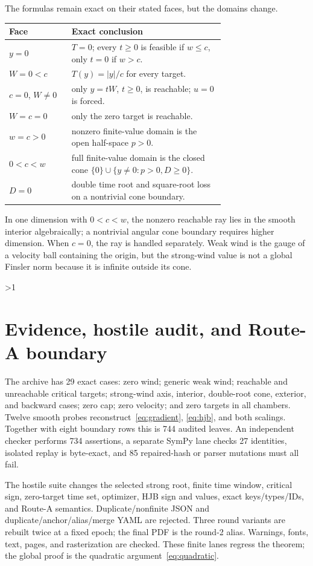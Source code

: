 \documentclass[10pt]{article}
\providecommand{\CRevisionRound}{2}
\begin{document}
The formulas remain exact on their stated faces, but the domains change.
\begin{center}\small
\begin{tabular}{@{}lp{0.71\linewidth}@{}}
\toprule
Face & Exact conclusion \\
\midrule
$y=0$ & $T=0$; every $t\ge0$ is feasible if $w\le c$, only $t=0$ if $w>c$. \\
$W=0<c$ & $T(y)=|y|/c$ for every target. \\
$c=0$, $W\ne0$ & only $y=tW$, $t\ge0$, is reachable; $u=0$ is forced. \\
$W=c=0$ & only the zero target is reachable. \\
$w=c>0$ & nonzero finite-value domain is the open half-space $p>0$. \\
$0<c<w$ & full finite-value domain is the closed cone $\{0\}\cup\{y\ne0:p>0,D\ge0\}$. \\
$D=0$ & double time root and square-root loss on a nontrivial cone boundary. \\
\bottomrule
\end{tabular}
\end{center}
In one dimension with $0<c<w$, the nonzero reachable ray lies in the smooth
interior algebraically; a nontrivial angular cone boundary requires higher
dimension. When $c=0$, the ray is handled separately. Weak wind is the gauge
of a velocity ball containing the origin, but the strong-wind value is not a
global Finsler norm because it is infinite outside its cone.
\fi

\ifnum\CRevisionRound>1
\section{Evidence, hostile audit, and Route-A boundary}
The archive has 29 exact cases: zero wind; generic weak wind; reachable and
unreachable critical targets; strong-wind axis, interior, double-root cone,
exterior, and backward cases; zero cap; zero velocity; and zero targets in
all chambers. Twelve smooth probes reconstruct~\eqref{eq:gradient},
\eqref{eq:hjb}, and both scalings. Together with eight boundary rows this is
744 audited leaves. An independent checker performs 734 assertions, a
separate SymPy lane checks 27 identities, isolated replay is byte-exact, and
85 repaired-hash or parser mutations must all fail.

The hostile suite changes the selected strong root, finite time window,
critical sign, zero-target time set, optimizer, HJB sign and values, exact
keys/types/IDs, and Route-A semantics. Duplicate/nonfinite JSON and
duplicate/anchor/alias/merge YAML are rejected. Three round variants are
rebuilt twice at a fixed epoch; the final PDF is the round-2 alias. Warnings,
fonts, text, pages, and rasterization are checked. These finite lanes regress the theorem; the global proof
is the quadratic argument~\eqref{eq:quadratic}.
\end{document}

